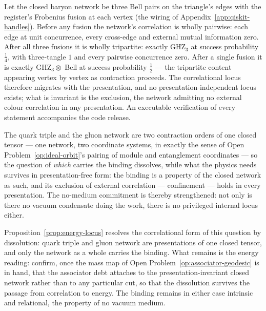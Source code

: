 \begin{proposition}\label{prop:energy-locus}
Let the closed baryon network be three Bell pairs on the triangle's edges with the register's
Frobenius fusion at each vertex (the wiring of Appendix~\ref{app:qiskit-handles}). Before any
fusion the network's correlation is wholly pairwise: each edge at unit concurrence, every
cross-edge and external mutual information zero. After all three fusions it is wholly tripartite:
exactly $\mathrm{GHZ}_3$ at success probability $\tfrac14$, with three-tangle $1$ and every
pairwise concurrence zero. After a single fusion it is exactly $\mathrm{GHZ}_3 \otimes$ Bell at
success probability $\tfrac12$ --- the tripartite content appearing vertex by vertex as
contraction proceeds. The correlational locus therefore migrates with the presentation, and no
presentation-independent locus exists; what is invariant is the exclusion, the network admitting no
external colour correlation in any presentation. An executable verification of every statement
accompanies the code release.
\end{proposition}

The quark triple and the gluon network are two contraction orders of one closed tensor --- one
network, two coordinate systems, in exactly the sense of Open Problem~\ref{op:ideal-orbit}'s
pairing of module and entanglement coordinates --- so the question of \emph{which} carries the
binding dissolves, while what the physics needs survives in presentation-free form: the binding is
a property of the closed network as such, and its exclusion of external correlation ---
confinement --- holds in every presentation. The no-medium commitment is thereby strengthened: not
only is there no vacuum condensate doing the work, there is no privileged internal locus either.

\begin{openproblem}\label{op:confinement-energy-locus}
Proposition~\ref{prop:energy-locus} resolves the correlational form of this question by
dissolution: quark triple and gluon network are presentations of one closed tensor, and only the
network as a whole carries the binding. What remains is the energy reading: confirm, once the mass
map of Open Problem~\ref{op:associator-geodesic} is in hand, that the associator debt attaches to
the presentation-invariant closed network rather than to any particular cut, so that the
dissolution survives the passage from correlation to energy. The binding remains in either case
intrinsic and relational, the property of no vacuum medium.
\end{openproblem}

